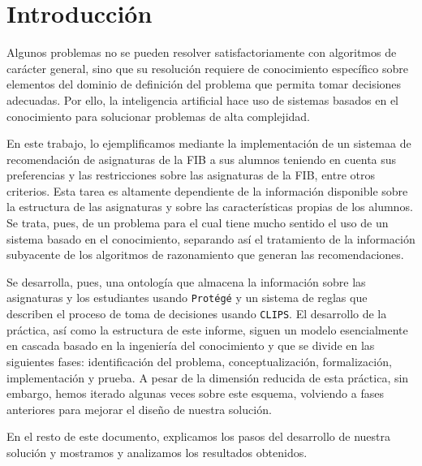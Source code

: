 
\section{Introducción} \label{sec:intro}

Algunos problemas no se pueden resolver satisfactoriamente con algoritmos de
carácter general, sino que su resolución requiere de conocimiento específico 
sobre elementos del dominio de definición del problema que permita tomar 
decisiones adecuadas. Por ello, la inteligencia artificial hace uso de 
sistemas basados en el conocimiento para solucionar problemas de alta 
complejidad.

En este trabajo, lo ejemplificamos mediante la implementación de un sistemaa 
de recomendación de asignaturas de la FIB a sus alumnos teniendo en cuenta sus 
preferencias y las restricciones sobre las asignaturas de la FIB, entre otros 
criterios. Esta tarea es altamente dependiente de la información disponible 
sobre la estructura de las asignaturas y sobre las características propias de 
los alumnos. Se trata, pues, de un problema para el cual tiene mucho sentido 
el uso de un sistema basado en el conocimiento, separando así el tratamiento 
de la información subyacente de los algoritmos de razonamiento que generan 
las recomendaciones.

Se desarrolla, pues, una ontología que almacena la información sobre las 
asignaturas y los estudiantes usando \texttt{Protégé} y un sistema de reglas 
que describen el proceso de toma de decisiones usando \texttt{CLIPS}. El 
desarrollo de la práctica, así como la estructura de este informe, siguen un 
modelo esencialmente en cascada basado en la ingeniería del conocimiento y 
que se divide en las siguientes fases: identificación del problema, 
conceptualización, formalización, implementación y prueba. A pesar de la 
dimensión reducida de esta práctica, sin embargo, hemos iterado algunas veces 
sobre este esquema, volviendo a fases anteriores para mejorar el diseño de 
nuestra solución.

En el resto de este documento, explicamos los pasos del desarrollo de nuestra 
solución y mostramos y analizamos los resultados obtenidos.

\clearpage


